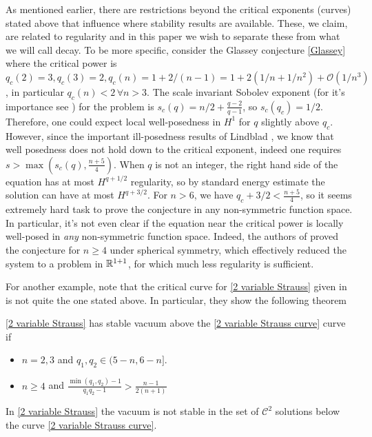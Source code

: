 \documentclass[11pt, oneside]{amsart}
\begin{document}
	As mentioned earlier, there are restrictions beyond the critical exponents (curves) stated above that influence where stability results are available. These, we claim, are related to regularity and in this paper we wish to separate these from what we will call decay. To be more specific, consider the Glassey conjecture \eqref{Glassey} where the critical power is $q_c(2)=3,q_c(3)=2,q_c(n)=1+2/(n-1)=1+2(1/n+1/n^2)+\mathcal{O}(1/n^3)$, in particular $q_c(n)<2\, \forall n>3$. The scale invariant Sobolev exponent (for it's importance see \cite{tao_nonlinear_2006}) for the problem is $s_c(q)=n/2+\frac{q-2}{q-1}$, so $s_c(q_c)=1/2$. Therefore, one could expect local well-posedness in $H^1$ for $q$ slightly above $q_c$. However, since the important ill-posedness results of Lindblad \cite{lindblad_sharp_1993}, we know that well posedness does not hold down to the critical exponent, indeed one requires $s>\max(s_c(q),\frac{n+5}{4})$. When $q$ is not an integer, the right hand side of the equation has at most $H^{q+1/2}$ regularity, so by standard energy estimate the solution can have at most $H^{q+3/2}$. For $n>6$, we have $q_c+3/2<\frac{n+5}{4}$, so it seems extremely hard task to prove the conjecture in any non-symmetric function space. In particular, it's not even clear if the equation near the critical power is locally well-posed in \textit{any} non-symmetric function space. Indeed, the authors of \cite{hidano_glassey_2012} proved the conjecture for $n\geq4$ under spherical symmetry, which effectively reduced the system to a problem in $\mathbb{R}^{1+1}$, for which much less regularity is sufficient.
	
	For another example, note that the critical curve for \eqref{2 variable Strauss} given in \cite{del_santo_global_1997} is not quite the one stated above. In particular, they show the following theorem
	\begin{theorem*}
		
		\eqref{2 variable Strauss} has stable vacuum above the \eqref{2 variable Strauss curve} curve if
		\begin{itemize}
			\item $n=2,3$ and $q_1,q_2\in(5-n,6-n]$.
			\item $n\geq4$ and $\frac{\min(q_1,q_2)-1}{q_1q_2-1}>\frac{n-1}{2(n+1)}$
		\end{itemize}
	 	
	 	In \eqref{2 variable Strauss} the vacuum is not stable in the set of $\mathcal{C}^2$ solutions below the curve \eqref{2 variable Strauss curve}.
	\end{theorem*}
	
\end{document}
